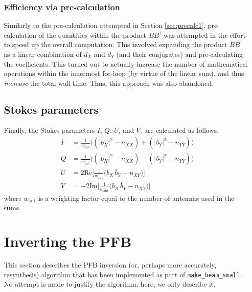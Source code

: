 \documentclass{article}
\begin{document}
\subsubsection{Efficiency via pre-calculation}
Similarly to the pre-calculation attempted in Section \ref{sec:precalc1}, pre-calculation of the quantities within the product $BB^\dagger$ was attempted in the effort to speed up the overall computation.
This involved expanding the product $BB^\dagger$ as a linear combination of $d_X$ and $d_Y$ (and their conjugates) and pre-calculating the coefficients.
This turned out to actually increase the number of mathematical operations within the innermost for-loop (by virtue of the linear sum), and thus \emph{increase} the total wall time.
Thus, this approach was also abandoned.

\subsection{Stokes parameters}

Finally, the Stokes parameters $I$, $Q$, $U$, and $V$, are calculated as follows.
\begin{align}
    I &= \frac{1}{w_\text{ant}}\bigg((|b_X|^2 - n_{XX}) + (|b_Y|^2 - n_{YY})\bigg) \\
    Q &= \frac{1}{w_\text{ant}}\bigg((|b_X|^2 - n_{XX}) - (|b_Y|^2 - n_{YY})\bigg) \\
    U &=  2 \text{Re}\bigg[\frac{1}{w_\text{ant}}\bigg(b_X\,\bar{b}_Y - n_{XY}\bigg)\bigg]\\
    V &= -2 \text{Im}\bigg[\frac{1}{w_\text{ant}}\bigg(b_X\,\bar{b}_Y - n_{XY}\bigg)\bigg]
\end{align}
where $w_\text{ant}$ is a weighting factor equal to the number of antennas used in the sums.

\newpage
\section{Inverting the PFB}

This section describes the PFB inversion (or, perhaps more accurately, resynthesis) algorithm that has been implemented as part of \texttt{make\_beam\_small}.
No attempt is made to justify the algorithm; here, we only describe it.
\end{document}
